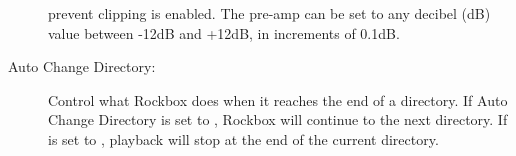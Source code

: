 \begin{description}
{{\begin{description}
        prevent clipping is enabled.  The pre-amp can be set to any 
        decibel (dB) value between -12dB and +12dB, in increments of 0.1{}dB.
      \end{description}
    }
  }
\item[Auto Change Directory: ]Control what Rockbox does when it reaches the end
  of a directory. If Auto Change Directory is set to , Rockbox 
  will continue to the next directory. If  is 
  set to , playback will stop at the end of the current directory.
\end{description}
